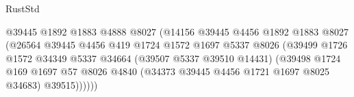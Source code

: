 \begin{lexlean}{RustStd}
\begin{coremodule}
                                                  @39445
                                                  @1892
                                                  @1883
                                                  @4888
                                                  @8027
                                                  (@14156
                                                    @39445
                                                    @4456
                                                    @1892
                                                    @1883
                                                    @8027
                                                    (@26564
                                                      @39445
                                                      @4456
                                                      @419
                                                      @1724
                                                      @1572
                                                      @1697
                                                      @5337
                                                      @8026
                                                      (@39499
                                                        @1726
                                                        @1572
                                                        @34349
                                                        @5337
                                                        @34664
                                                        (@39507 @5337 @39510 @14431)
                                                        (@39498
                                                          @1724
                                                          @169
                                                          @1697
                                                          @57
                                                          @8026
                                                          @4840
                                                          (@34373
                                                            @39445
                                                            @4456
                                                            @1721
                                                            @1697
                                                            @8025
                                                            @34683)
                                                          @39515))))))

\end{coremodule}
\end{lexlean}
